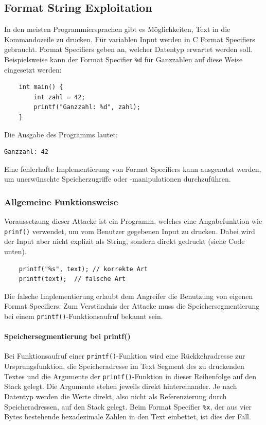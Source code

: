 \documentclass[11pt, a4paper]{article}
\begin{document}
\subsection{Format String Exploitation}\label{subsec:formatstringexploitation}
In den meisten Programmiersprachen gibt es Möglichkeiten, Text in die Kommandozeile zu drucken. Für variablen Input werden in C Format Specifiers gebraucht. Format Specifiers geben an, welcher Datentyp erwartet werden soll. Beispielsweise kann der Format Specifier \texttt{\%d} für Ganzzahlen auf diese Weise eingesetzt werden: 
\begin{lstlisting}
	int main() {
		int zahl = 42;
		printf("Ganzzahl: %d", zahl);  
	}
\end{lstlisting}
Die Ausgabe des Programms lautet:
\begin{lstlisting}[style=COutputStyle]
	Ganzzahl: 42
\end{lstlisting}

Eine fehlerhafte Implementierung von Format Specifiers kann ausgenutzt werden, um unerwünschte Speicherzugriffe oder -manipulationen durchzuführen. 

\subsubsection{Allgemeine Funktionsweise}
Voraussetzung dieser Attacke ist ein Programm, welches eine Angabefunktion wie \texttt{prinf()} verwendet, um vom Benutzer gegebenen Input zu drucken. Dabei wird der Input aber nicht explizit als String, sondern direkt gedruckt (siehe Code unten).
\begin{lstlisting}
	printf("%s", text); // korrekte Art
	printf(text);  // falsche Art
\end{lstlisting}

Die falsche Implementierung erlaubt dem Angreifer die Benutzung von eigenen Format Specifiers. Zum Verständnis der Attacke muss die Speichersegmentierung bei einem \texttt{printf()}-Funktionsaufruf bekannt sein. 

\paragraph{Speichersegmentierung bei printf()}
Bei Funktionsaufruf einer \texttt{printf()}-Funktion wird eine Rückkehradresse zur Ursprungsfunktion, die Speicheradresse im Text Segment des zu druckenden Textes und die Argumente der \texttt{printf()}-Funktion in dieser Reihenfolge auf den Stack gelegt. Die Argumente stehen jeweils direkt hintereinander. Je nach Datentyp werden die Werte direkt, also nicht als Referenzierung durch Speicheradressen, auf den Stack gelegt. Beim Format Specifier \texttt{\%x}, der aus vier Bytes bestehende hexadezimale Zahlen in den Text einbettet, ist dies der Fall. 
\end{document}
